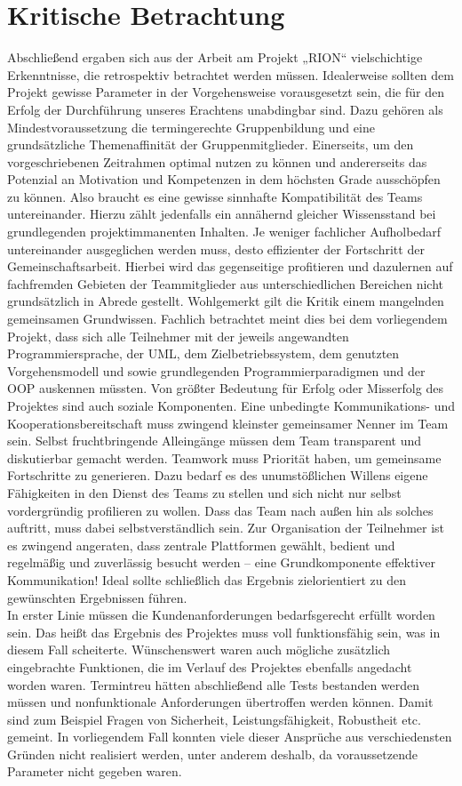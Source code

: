 \chapter{Kritische Betrachtung}

Abschließend ergaben sich aus der Arbeit am Projekt „RION“ vielschichtige Erkenntnisse, die retrospektiv betrachtet werden müssen.
Idealerweise sollten dem Projekt gewisse Parameter in der Vorgehensweise vorausgesetzt sein, die für den Erfolg der Durchführung unseres Erachtens unabdingbar sind. Dazu gehören als Mindestvoraussetzung die termingerechte Gruppenbildung und eine grundsätzliche Themenaffinität der Gruppenmitglieder. Einerseits, um den vorgeschriebenen Zeitrahmen optimal nutzen zu können und andererseits das Potenzial an Motivation und Kompetenzen in dem höchsten Grade ausschöpfen zu können. Also braucht es eine gewisse sinnhafte Kompatibilität des Teams untereinander. Hierzu zählt jedenfalls ein annähernd gleicher Wissensstand bei grundlegenden projektimmanenten Inhalten. Je weniger fachlicher Aufholbedarf untereinander ausgeglichen werden muss, desto effizienter der Fortschritt der Gemeinschaftsarbeit. Hierbei wird das gegenseitige profitieren und dazulernen auf fachfremden Gebieten der Teammitglieder aus unterschiedlichen Bereichen nicht grundsätzlich in Abrede gestellt. Wohlgemerkt gilt die Kritik einem mangelnden gemeinsamen Grundwissen. Fachlich betrachtet meint dies bei dem vorliegendem Projekt, dass sich alle Teilnehmer mit der jeweils angewandten Programmiersprache, der UML, dem Zielbetriebssystem, dem genutzten Vorgehensmodell und sowie grundlegenden Programmierparadigmen und der OOP auskennen müssten.
Von größter Bedeutung für Erfolg oder Misserfolg des Projektes sind auch soziale Komponenten. Eine unbedingte Kommunikations- und Kooperationsbereitschaft muss zwingend kleinster gemeinsamer Nenner im Team sein. Selbst fruchtbringende Alleingänge müssen dem Team transparent und diskutierbar gemacht werden. Teamwork muss Priorität haben, um gemeinsame Fortschritte zu generieren. Dazu bedarf es des unumstößlichen Willens eigene Fähigkeiten in den Dienst des Teams zu stellen und sich nicht nur selbst vordergründig profilieren zu wollen. Dass das Team nach außen hin als solches auftritt, muss dabei selbstverständlich sein.
Zur Organisation der Teilnehmer ist es zwingend angeraten, dass zentrale Plattformen gewählt, bedient und regelmäßig und zuverlässig besucht werden – eine Grundkomponente effektiver Kommunikation!
Ideal sollte schließlich das Ergebnis zielorientiert zu den gewünschten Ergebnissen führen.\\
In erster Linie müssen die Kundenanforderungen bedarfsgerecht erfüllt worden sein. Das heißt das Ergebnis des Projektes muss voll funktionsfähig sein, was in diesem Fall scheiterte. Wünschenswert waren auch mögliche zusätzlich eingebrachte Funktionen, die im Verlauf des Projektes ebenfalls angedacht worden waren.
Termintreu hätten abschließend alle Tests bestanden werden müssen und nonfunktionale Anforderungen übertroffen werden können. Damit sind zum Beispiel Fragen von Sicherheit, Leistungsfähigkeit, Robustheit etc. gemeint.
In vorliegendem Fall konnten viele dieser Ansprüche aus verschiedensten Gründen nicht realisiert werden, unter anderem deshalb, da voraussetzende Parameter nicht gegeben waren.
